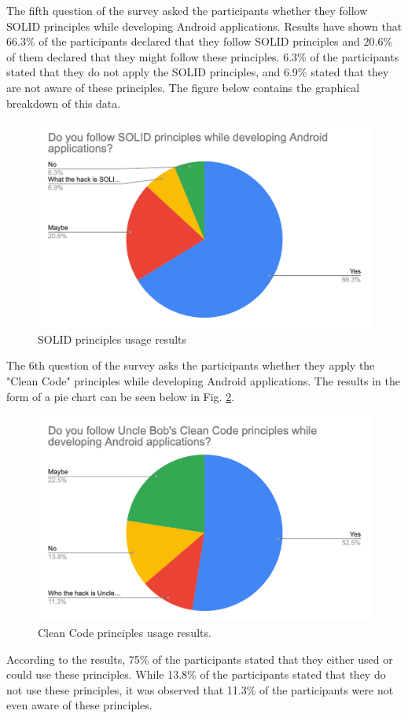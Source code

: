 The fifth question of the survey asked the participants whether they follow SOLID principles while developing Android applications. Results have shown that 66.3\% of the participants declared that they follow SOLID principles and 20.6\% of them declared that they might follow these principles. 6.3\% of the participants stated that they do not apply the SOLID principles, and 6.9\% stated that they are not aware of these principles. The figure below contains the graphical breakdown of this data.
\begin{figure}[ht!]
    \centering
    \includegraphics[scale=0.22]{figures/survey_q5_solid.png}
    \caption{SOLID principles usage results}
    \label{fig:solid}
\end{figure}
\FloatBarrier

The 6th question of the survey asks the participants whether they apply the "Clean Code" principles while developing Android applications. The results in the form of a pie chart can be seen below in Fig. \ref{fig:clean_code}.
\begin{figure}[ht!]
    \centering
    \includegraphics[scale=0.22]{figures/survey_q6_clean_code.png}
    \caption{Clean Code principles usage results.}
    \label{fig:clean_code}
\end{figure}
\FloatBarrier

According to the results, 75\% of the participants stated that they either used or could use these principles. While 13.8\% of the participants stated that they do not use these principles, it was observed that 11.3\% of the participants were not even aware of these principles.
